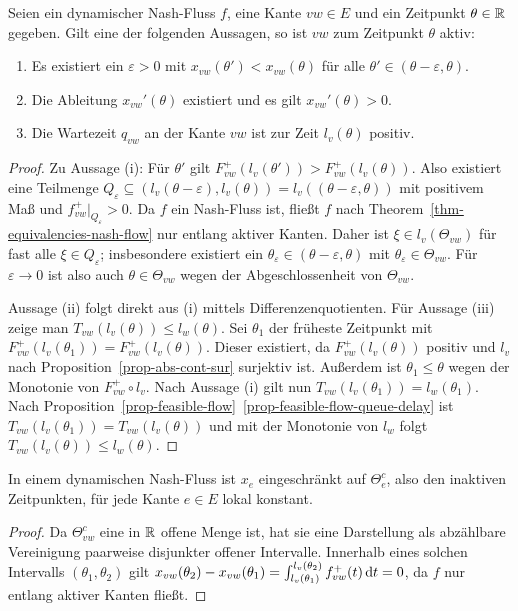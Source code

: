 \begin{lemma}\label{lemma-nash-flow-waiting-queue-implies-active-edge}
	Seien ein dynamischer Nash-Fluss $f$, eine Kante $vw\in E$ und ein Zeitpunkt $\theta\in\mathbb{R}$ gegeben.
	Gilt eine der folgenden Aussagen, so ist $vw$ zum Zeitpunkt $\theta$ aktiv:
	\begin{enumerate}[label=(\roman*)]
		\item Es existiert ein $\varepsilon>0$ mit $x_{vw}(\theta')<x_{vw}(\theta)$ für alle $\theta'\in(\theta-\varepsilon, \theta)$.
		\item Die Ableitung $x_{vw}'(\theta)$ existiert und es gilt $x_{vw}'(\theta)> 0$.
		\item Die Wartezeit $q_{vw}$ an der Kante $vw$ ist zur Zeit $l_v(\theta)$ positiv.
	\end{enumerate}
\end{lemma}
\begin{proof}
	Zu Aussage (i): Für $\theta'$ gilt $F_{vw}^+(l_v(\theta')) > F_{vw}^+(l_v(\theta))$.
	Also existiert eine Teilmenge $Q_\varepsilon \subseteq (l_v(\theta-\varepsilon), l_v(\theta))=l_v((\theta - \varepsilon, \theta))$ mit positivem Maß und $f_{vw}^+\big|_{Q_\varepsilon} > 0$.
	Da $f$ ein Nash-Fluss ist, fließt $f$ nach Theorem~\ref{thm-equivalencies-nash-flow} nur entlang aktiver Kanten.
	Daher ist $\xi\in l_v(\Theta_{vw})$ für fast alle $\xi\in Q_\varepsilon$; insbesondere existiert ein $\theta_\varepsilon\in (\theta-\varepsilon, \theta)$ mit $\theta_\varepsilon\in\Theta_{vw}$.
	Für $\varepsilon\rightarrow0$ ist also auch $\theta\in\Theta_{vw}$ wegen der Abgeschlossenheit von $\Theta_{vw}$.
	
	Aussage (ii) folgt direkt aus (i) mittels Differenzenquotienten.
	Für Aussage (iii) zeige man $T_{vw}(l_v(\theta)) \leq l_w(\theta)$.
	Sei $\theta_1$ der früheste Zeitpunkt mit $F_{vw}^+(l_v(\theta_1)) = F_{vw}^+(l_v(\theta))$.
	Dieser existiert, da $F_{vw}^+(l_v(\theta))$ positiv und $l_v$ nach Proposition~\ref{prop-abs-cont-sur} surjektiv ist.
	Außerdem ist $\theta_1 \leq \theta$ wegen der Monotonie von $F_{vw}^+ \circ l_v$.
	Nach Aussage (i) gilt nun $T_{vw}(l_v(\theta_1)) = l_w(\theta_1)$.
	Nach Proposition~\ref{prop-feasible-flow}~\ref{prop-feasible-flow-queue-delay} ist $T_{vw}(l_v(\theta_1)) = T_{vw}(l_v(\theta))$ und mit der Monotonie von $l_w$ folgt $T_{vw}(l_v(\theta))\leq l_w(\theta)$.
\end{proof}
\begin{lemma}\label{lemma-x-locally-constant}
	In einem dynamischen Nash-Fluss ist $x_e$ eingeschränkt auf $\Theta_e^c$, also den inaktiven Zeitpunkten, für jede Kante $e\in E$ lokal konstant.
\end{lemma}
\begin{proof}
	Da $\Theta_{vw}^c$ eine in $\mathbb{R}$ offene Menge ist, hat sie eine Darstellung als abzählbare Vereinigung paarweise disjunkter offener Intervalle.
	Innerhalb eines solchen Intervalls $(\theta_1, \theta_2)$ gilt $x_{vw}(\theta_2) - x_{vw}(\theta_1) = \int_{l_v(\theta_1)}^{l_v(\theta_2)} f_{vw}^+(t) \mathop{}\!\mathrm{d} t = 0$, da $f$ nur entlang aktiver Kanten fließt.
\end{proof}

